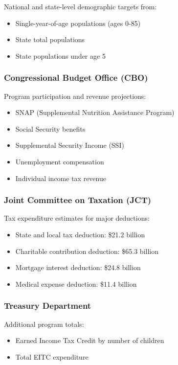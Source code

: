 National and state-level demographic targets from:
\begin{itemize}
\item Single-year-of-age populations (ages 0-85)
\item State total populations
\item State populations under age 5
\end{itemize}

\subsubsection{Congressional Budget Office (CBO)}

Program participation and revenue projections:
\begin{itemize}
\item SNAP (Supplemental Nutrition Assistance Program)
\item Social Security benefits
\item Supplemental Security Income (SSI)
\item Unemployment compensation
\item Individual income tax revenue
\end{itemize}

\subsubsection{Joint Committee on Taxation (JCT)}

Tax expenditure estimates for major deductions:
\begin{itemize}
\item State and local tax deduction: \$21.2 billion
\item Charitable contribution deduction: \$65.3 billion
\item Mortgage interest deduction: \$24.8 billion
\item Medical expense deduction: \$11.4 billion
\end{itemize}

\subsubsection{Treasury Department}

Additional program totals:
\begin{itemize}
\item Earned Income Tax Credit by number of children
\item Total EITC expenditure
\end{itemize}

